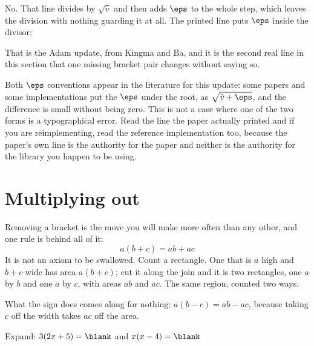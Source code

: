 \begin{fr}
\begin{ansblock}
No. That line divides by $\sqrt{\hat{v}}$ and then adds $\eps$ to the whole
step, which leaves the division with nothing guarding it at all. The printed
line puts $\eps$ inside the divisor:
\begin{center}
\end{center}
\end{ansblock}

That is the Adam update, from Kingma and Ba, and it is the second real line in
this section that one missing bracket pair changes without saying so.

\begin{note}
Both $\eps$ conventions appear in the literature for this update: some papers
and some implementations put the $\eps$ under the root, as
$\sqrt{\hat{v} + \eps}$, and the difference is small without being zero. This
is not a case where one of the two forms is a typographical error. Read the
line the paper actually printed \dash{} and if you are reimplementing, read the
reference implementation too, because the paper's own line is the authority for
the paper and neither is the authority for the library you happen to be using.
\end{note}
\end{fr}

\section{Multiplying out}
\label{sec:F02-expanding}

\begin{fr}
Removing a bracket is the move you will make more often than any other, and one
rule is behind all of it:
\[ a(b + c) = ab + ac \]
It is not an axiom to be swallowed. Count a rectangle. One that is $a$ high and
$b + c$ wide has area $a(b+c)$; cut it along the join and it is two rectangles,
one $a$ by $b$ and one $a$ by $c$, with areas $ab$ and $ac$. The same region,
counted two ways.

What the sign does comes along for nothing: $a(b - c) = ab - ac$, because
taking $c$ off the width takes $ac$ off the area.

Expand: $3(2x + 5) = \blank$ and $x(x - 4) = \blank$
\dotline
\nextframe
\end{fr}

